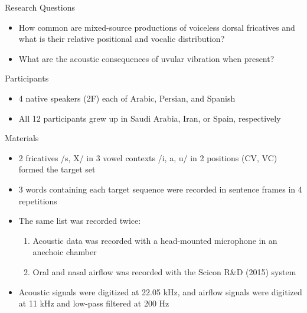 \documentclass[final]{beamer}
\newlength{\onecolwid}
\begin{document}
\begin{frame}[t]
\begin{columns}[t]
\begin{column}{\onecolwid}



\begin{block}{Research Questions}
\begin{itemize}
     \item How common are mixed-source productions of voiceless dorsal fricatives and what is their relative positional and vocalic distribution?
     \item What are the acoustic consequences of uvular vibration when present?
\end{itemize}
\end{block}


\begin{block}{Participants}
  \begin{itemize}
    \item 4 native speakers (2F) each of Arabic, Persian, and Spanish
    \item All 12 participants grew up in Saudi Arabia, Iran, or Spain, respectively
  \end{itemize}
\end{block}


\begin{block}{Materials}
  \begin{itemize}
     \item 2 fricatives /s, X/ in 3 vowel contexts /i, a, u/ in 2 positions (CV, VC) formed the target set 
     \item 3 words containing each target sequence were recorded in sentence frames in 4 repetitions
     \item The same list was recorded twice:
       \begin{enumerate}
         \item Acoustic data was recorded with a head-mounted microphone in an anechoic chamber 
         \item Oral and nasal airflow was recorded with the Scicon R\&D (2015) system
       \end{enumerate}
     \item Acoustic signals were digitized at 22.05 kHz, and airflow signals were digitized at 11 kHz and low-pass filtered at 200 Hz
  \end{itemize}
\end{block}


\end{column}
\end{columns}
\end{frame}
\end{document}
